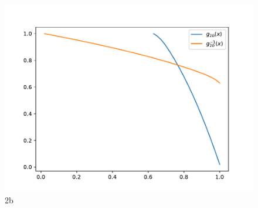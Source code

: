 \begin{figure}[H]
    \caption{2b}
        \hspace{-1cm}
        \includegraphics[scale=0.5]{template-fig/p3.pdf}
        \centering
\end{figure}
